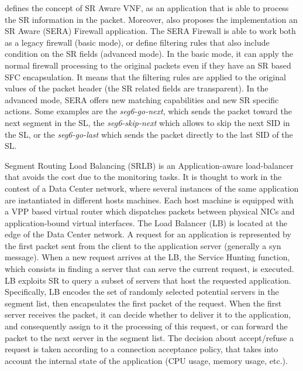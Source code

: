 \cite{abdelsalam2018sera} defines the concept of SR Aware VNF, as an application that is able to process the SR information in the packet.
Moreover, \cite{abdelsalam2018sera} also proposes the implementation an SR Aware (SERA) Firewall application.
The SERA Firewall is able to work both as a legacy firewall (basic mode), or define filtering rules that also include condition on the SR fields (advanced mode).
In the basic mode, it can apply the normal firewall processing to the original packets even if they have an SR based SFC encapsulation.
It means that the filtering rules are applied to the original values of the packet header (the SR related fields are transparent).
In the advanced mode, SERA offers new matching capabilities and new SR specific actions.
Some examples are the \emph{seg6-go-next}, which sends the packet toward the next segment in the SL, the \emph{seg6-skip-next} which allows to skip the next SID in the SL, or the \emph{seg6-go-last} which sends the packet directly to the last SID of the SL.

Segment Routing Load Balancing (SRLB) \cite{srlb} is an Application-aware load-balancer that avoids the cost due to the monitoring tasks.
It is thought to work in the contest of a Data Center network, where several instances of the same application are instantiated in different hosts machines.
Each host machine is equipped with a VPP based virtual router which dispatches packets between physical NICs and application-bound virtual interfaces.
The Load Balancer (LB) is located at the edge of the Data Center network.
A request for an application is represented by the first packet sent from the client to the application server (generally a syn message). 
When a new request arrives at the LB, the Service Hunting function, which consists in finding a server that can serve the current request, is executed.
LB exploits SR to query a subset of servers that host the requested application.
Specifically, LB encodes the set of randomly selected potential servers in the segment list, then encapsulates the first packet of the request.
When the first server receives the packet, it can decide whether to deliver it to the application, and consequently assign to it the processing of this request, or can forward the packet to the next server in the segment list.
The decision about accept/refuse a request is taken according to a connection acceptance policy, that takes into account the internal state of the application (CPU usage, memory usage, etc.).

